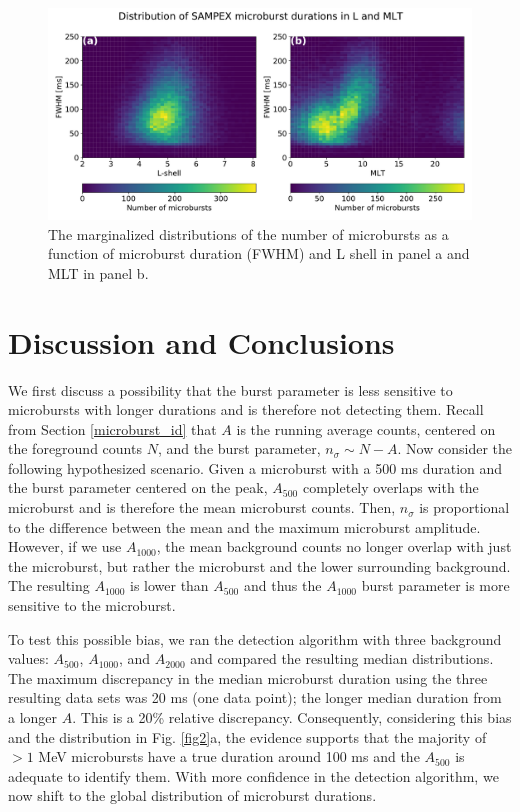\documentclass[draft]{agujournal2019}
\begin{document}
\begin{figure}
\noindent\includegraphics[width=\textwidth]{figures/fig4.pdf}
\caption{The marginalized distributions of the number of microbursts as a function of microburst duration (FWHM) and L shell in panel a and MLT in panel b.}
\label{fig4}
\end{figure}

\section{Discussion and Conclusions}\label{discussion}

We first discuss a possibility that the burst parameter is less sensitive to microbursts with longer durations and is therefore not detecting them. Recall from Section \ref{microburst_id} that $A$ is the running average counts, centered on the foreground counts $N$, and the burst parameter, $n_\sigma \sim N - A$. Now consider the following hypothesized scenario. Given a microburst with a 500 ms duration and the burst parameter centered on the peak, $A_{500}$ completely overlaps with the microburst and is therefore the mean microburst counts. Then, $n_\sigma$ is proportional to the difference between the mean and the maximum microburst amplitude. However, if we use $A_{1000}$, the mean background counts no longer overlap with just the microburst, but rather the microburst and the lower surrounding background. The resulting $A_{1000}$ is lower than $A_{500}$ and thus the $A_{1000}$ burst parameter is more sensitive to the microburst.

To test this possible bias, we ran the detection algorithm with three background values: $A_{500}$, $A_{1000}$, and $A_{2000}$ and compared the resulting median distributions. The maximum discrepancy in the median microburst duration using the three resulting data sets was 20 ms (one data point); the longer median duration from a longer $A$. This is a 20\% relative discrepancy. Consequently, considering this bias and the distribution in Fig. \ref{fig2}a, the evidence supports that the majority of $>1$ MeV microbursts have a true duration around 100 ms and the $A_{500}$ is adequate to identify them. With more confidence in the detection algorithm, we now shift to the global distribution of microburst durations.
\end{document}
